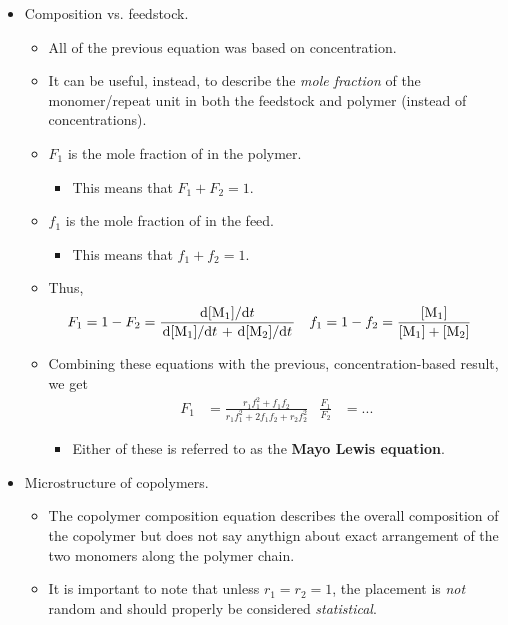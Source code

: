 \documentclass[../notes.tex]{subfiles}
\begin{document}
\begin{itemize}
    \item Composition vs. feedstock.
    \begin{itemize}
        \item All of the previous equation was based on concentration.
        \item It can be useful, instead, to describe the \emph{mole fraction} of the monomer/repeat unit in both the feedstock and polymer (instead of concentrations).
        \item $F_1$ is the mole fraction of  in the polymer.
        \begin{itemize}
            \item This means that $F_1+F_2=1$.
        \end{itemize}
        \item $f_1$ is the mole fraction of  in the feed.
        \begin{itemize}
            \item This means that $f_1+f_2=1$.
        \end{itemize}
        \item Thus,
        \begin{align*}
            F_1 &= 1-F_2
                = \frac{\dv*{[\ce{M1}]}{t}}{\dv*{[\ce{M1}]}{t}+\dv*{[\ce{M2}]}{t}}&
            f_1 &= 1-f_2
                = \frac{[\ce{M1}]}{[\ce{M1}]+[\ce{M2}]}
        \end{align*}
        \item Combining these equations with the previous, concentration-based result, we get
        \begin{align*}
            F_1 &= \frac{r_1f_1^2+f_1f_2}{r_1f_1^2+2f_1f_2+r_2f_2^2}&
            \frac{F_1}{F_2} &= ...
        \end{align*}
        \begin{itemize}
            \item Either of these is referred to as the \textbf{Mayo Lewis equation}.
        \end{itemize}
    \end{itemize}
    \item Microstructure of copolymers.
    \begin{itemize}
        \item The copolymer composition equation describes the overall composition of the copolymer but does not say anythign about exact arrangement of the two monomers along the polymer chain.
        \item It is important to note that unless $r_1=r_2=1$, the placement is \emph{not} random and should properly be considered \emph{statistical}.

\end{itemize}
\end{itemize}
\end{document}
